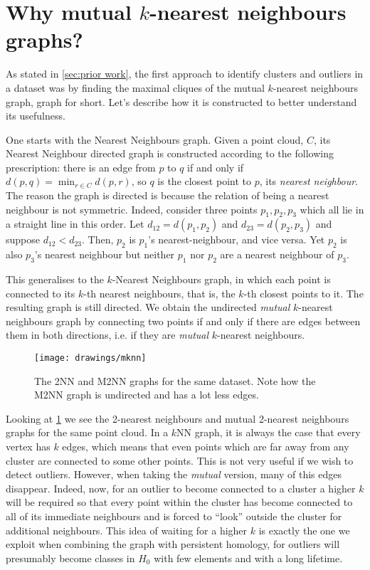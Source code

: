 \documentclass[../main.tex]{subfiles}
\begin{document}
\section{Why mutual \texorpdfstring{\( k \)}{k}-nearest neighbours graphs?}
As stated in \cref{sec:prior work}, the first approach to identify clusters and outliers
in a dataset was by finding the maximal cliques of the mutual \( k \)-nearest neighbours
graph, \MKNN graph for short. Let's describe how it is constructed to better understand
its usefulness. 

One starts with the Nearest Neighbours graph. Given a point cloud, \( C
\), its Nearest Neighbour directed graph is constructed according to the following
prescription: there is an edge from \( p \) to \( q \) if and only if \( d(p,q) = \min_{r
	\in C} d(p,r) \), so \( q \) is the closest point to \( p \), its \emph{nearest
neighbour}. The reason the graph is directed is because the relation of being a nearest
neighbour is not symmetric. Indeed, consider three points \( p_1, p_2, p_3 \) which all
lie in a straight line in this order. Let \( d_{12} = d(p_1, p_2) \)  and \( d_{23} =
d(p_2,p_3) \) and suppose \( d_{12} < d_{23} \). Then, \( p_2 \) is \( p_1 \)'s
nearest-neighbour, and vice versa. Yet \( p_2 \) is also \( p_3 \)'s nearest neighbour but
neither \( p_1 \) nor \( p_2 \) are a nearest neighbour of \( p_3 \).

This generalises to the \( k \)-Nearest Neighbours graph, in which each point is connected
to its \( k \)-th nearest neighbours, that is, the \( k \)-th closest points to it. The
resulting graph is still directed. We obtain the undirected \emph{mutual} \( k \)-nearest
neighbours graph by connecting two points if and only if there are edges between them
in both directions, i.e. if they are \emph{mutual} \( k \)-nearest neighbours. 

\begin{figure}[htb]
	\centering
	\texttt{[image: drawings/mknn]}
	\caption{The 2NN and M2NN graphs for the same dataset. Note how the M2NN graph is
	undirected and has a lot less edges.}
	\label{fig:mknn}
\end{figure}

Looking at \cref{fig:mknn} we see the 2-nearest neighbours and mutual 2-nearest neighbours
graphs for the same point cloud. In a \( k \)NN	 graph, it is always the case that every
vertex has \( k \) edges, which means that even points which are far away from any cluster
are connected to some other points. This is not very useful if we wish to detect outliers.
However, when taking the \emph{mutual} version, many of this edges disappear. Indeed, now,
for an outlier to become connected to a cluster a higher \( k \) will be required so that
every point within the cluster has become connected to all of its immediate neighbours and
is forced to ``look'' outside the cluster for additional neighbours. This idea of waiting
for a higher \( k \) is exactly the one we exploit when combining the \MKNN graph with
persistent homology, for outliers will presumably become classes in	\( H_0 \) with few
elements and with a long lifetime. 
\end{document}
